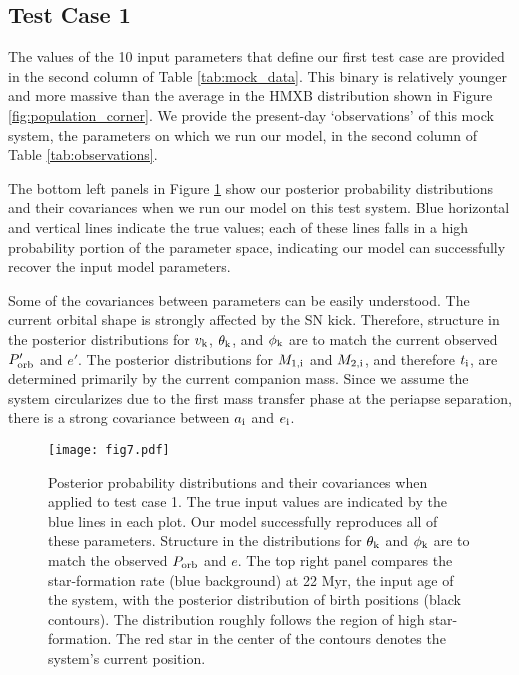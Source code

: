 \documentclass[usenatbib]{mnras}
\begin{document}
\subsection{Test Case 1} \label{sec:test1}


The values of the 10 input parameters that define our first test case are provided in the second column of Table \ref{tab:mock_data}. This binary is relatively younger and more massive than the average in the HMXB distribution shown in Figure \ref{fig:population_corner}. We provide the present-day `observations' of this mock system, the parameters on which we run our model, in the second column of Table \ref{tab:observations}.

The bottom left panels in Figure \ref{fig:test1_corner} show our posterior probability distributions and their covariances when we run our model on this test system. Blue horizontal and vertical lines indicate the true values; each of these lines falls in a high probability portion of the parameter space, indicating our model can successfully recover the input model parameters. 

Some of the covariances between parameters can be easily understood. The current orbital shape is strongly affected by the SN kick. Therefore, structure in the posterior distributions for $v_{\rm k}$, $\theta_{\rm k}$, and $\phi_{\rm k}$ are to match the current observed $P'_{\rm orb}$ and $e'$. The posterior distributions for $M_{\rm 1,i}$ and $M_{\rm 2,i}$, and therefore $t_{\rm i}$, are determined primarily by the current companion mass. Since we assume the system circularizes due to the first mass transfer phase at the periapse separation, there is a strong covariance between $a_{\rm i}$ and $e_{\rm i}$.


\begin{figure*}
\begin{center}
\texttt{[image: fig7.pdf]}
\caption{Posterior probability distributions and their covariances when applied to test case 1. The true input values are indicated by the blue lines in each plot. Our model successfully reproduces all of these parameters. Structure in the distributions for $\theta_{\rm k}$ and $\phi_{\rm k}$ are to match the observed $P_{\rm orb}$ and $e$. The top right panel compares the star-formation rate (blue background) at 22 Myr, the input age of the system, with the posterior distribution of birth positions (black contours). The distribution roughly follows the region of high star-formation. The red star in the center of the contours denotes the system's current position. }
\label{fig:test1_corner}
\end{center}
\end{figure*}
\end{document}
